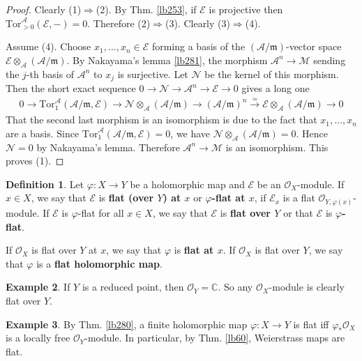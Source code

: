 \documentclass[12pt,b5paper,notitlepage]{report}
\theoremstyle{definition}
\newtheorem{df}{Definition}[section]
\newtheorem{eg}[df]{Example}
\theoremstyle{plain}
\newcommand{\mc}{\mathcal}
\newcommand{\scr}{\mathscr}
\newcommand{\Cbb}{\mathbb C}
\newcommand{\Tor}{\mathrm{Tor}}
\newcommand{\mk}{\mathfrak m}
\numberwithin{equation}{section}
\begin{document}
\begin{proof}
Clearly (1)$\Rightarrow$(2). By Thm. \ref{lb253}, if $\mc E$ is projective then $\Tor_{>0}^{\mc A}(\mc E,-)=0$. Therefore   (2)$\Rightarrow$(3). Clearly (3)$\Rightarrow$(4).

Assume (4). Choose $x_1,\dots,x_n\in\mc E$ forming a basis of the $(\mc A/\mk)$-vector space $\mc E\otimes_{\mc A}(\mc A/\mk)$. By Nakayama's lemma \ref{lb281}, the morphism $\mc A^n\rightarrow\mc M$ sending the $j$-th basis of $\mc A^n$ to $x_j$ is surjective. Let $\mc N$ be the kernel of this morphism. Then the short exact sequence $0\rightarrow\mc N\rightarrow\mc A^n\rightarrow\mc E\rightarrow0$ gives a long one
\begin{align*}
0\rightarrow\Tor_1^{\mc A}(\mc A/\mk,\mc E)\rightarrow\mc N\otimes_{\mc A}(\mc A/\mk)\rightarrow (\mc A/\mk)^n\xrightarrow{\simeq}\mc E\otimes_{\mc A}(\mc A/\mk)\rightarrow0
\end{align*}
That the second last morphism is an isomorphism is due to the fact that $x_1,\dots,x_n$ are a basis. Since  $\Tor_1^{\mc A}(\mc A/\mk,\mc E)=0$, we have $\mc N\otimes_{\mc A}(\mc A/\mk)=0$. Hence $\mc N=0$ by Nakayama's lemma. Therefore $\mc A^n\rightarrow\mc M$ is an isomorphism. This proves (1).
\end{proof}





\begin{df}
Let $\varphi:X\rightarrow Y$ be a holomorphic map and $\scr E$ be an $\scr O_X$-module. If $x\in X$, we say that $\scr E$ is \textbf{flat (over $Y$) at $x$} or \textbf{$\varphi$-flat at $x$},  if $\scr E_x$ is a flat $\scr O_{Y,\varphi(x)}$-module. If $\scr E$ is $\varphi$-flat for all $x\in X$, we say that $\scr E$ is \textbf{flat over $Y$} or that $\scr E$ is \textbf{$\varphi$-flat}.

If $\scr O_X$ is flat over $Y$ at $x$, we say that $\varphi$ is \textbf{flat at $x$}. If $\scr O_X$ is flat over $Y$, we say that $\varphi$ is a \textbf{flat holomorphic map}.    \hfill  \qedsymbol
\end{df}


\begin{eg}
If $Y$ is a reduced point, then $\scr O_{Y}=\Cbb$. So any $\scr O_X$-module is clearly flat over $Y$.
\end{eg}


\begin{eg}\label{lb414}
By Thm. \ref{lb280}, a finite holomorphic map $\varphi:X\rightarrow Y$ is flat iff $\varphi_*\scr O_X$ is a locally free $\scr O_Y$-module. In particular, by Thm. \ref{lb60}, Weierstrass maps are flat.
\end{eg}
\end{document}
